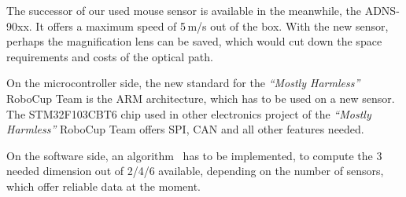 \documentclass[12pt,a4paper]{article}
\newcommand{\MH}{\emph{``Mostly Harmless''} RoboCup Team\xspace}
\begin{document}
The successor of our used mouse sensor is available in the meanwhile, the ADNS-90xx.
It offers a maximum speed of 5\,m/s out of the box.
With the new sensor, perhaps the magnification lens can be saved, which would cut down the space requirements and costs of the optical path.

On the microcontroller side, the new standard for the \MH is the ARM architecture, which has to be used on a new sensor.
The STM32F103CBT6 chip used in other electronics project of the \MH offers SPI, CAN and all other features needed.

On the software side, an algorithm~\cite{two_mice} has to be implemented, to compute the 3 needed dimension out of 2/4/6 available, depending on the number of sensors, which offer reliable data at the moment.


\clearpage
{}
\label{Bibliography}


%
\end{document}
